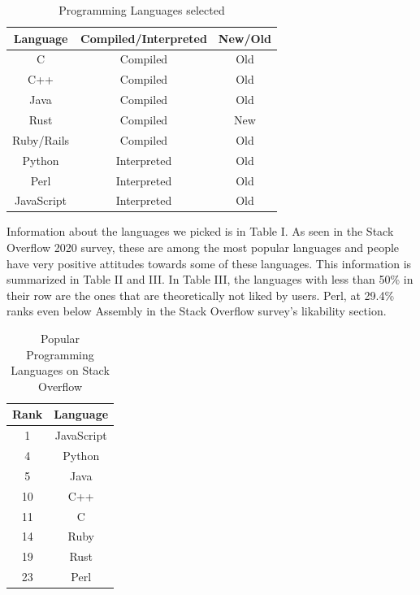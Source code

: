 \documentclass[conference]{IEEEtran}
\begin{document}
\begin{table}[htbp]
\caption{Programming Languages selected}
\begin{center}
\begin{tabular}{|c|c|c|}
\hline
\textbf{Language}&\textbf{Compiled/Interpreted}& \textbf{New/Old}\\
\hline
C&Compiled&Old\\
\hline
C++&Compiled&Old\\
\hline
Java&Compiled&Old\\
\hline
Rust&Compiled&New\\
\hline
Ruby/Rails&Compiled&Old\\
\hline
Python&Interpreted&Old\\
\hline
Perl&Interpreted&Old\\
\hline
JavaScript&Interpreted&Old\\
\hline
\end{tabular}
\label{tab1}
\end{center}
\end{table}

Information about the languages we picked is in Table I. As seen in the Stack Overflow 2020 survey\cite{b29}, these are among the most popular languages and people have very positive attitudes towards some of these languages. This information is summarized in Table II and III. In Table III, the languages with less than 50\% in their row are the ones that are theoretically not liked by users. Perl, at 29.4\% ranks even below Assembly in the Stack Overflow survey's likability section.\\

\begin{table}[htbp]
\caption{Popular Programming Languages on Stack Overflow}
\begin{center}
\begin{tabular}{|c|c|}
\hline
\textbf{Rank}&\textbf{Language}\\
\hline
1&JavaScript\\
\hline
4&Python\\
\hline
5&Java\\
\hline
10&C++\\
\hline
11&C\\
\hline
14&Ruby\\
\hline
19&Rust\\
\hline
23&Perl\\
\hline
\end{tabular}
\label{tab1}
\end{center}
\end{table}
\end{document}
